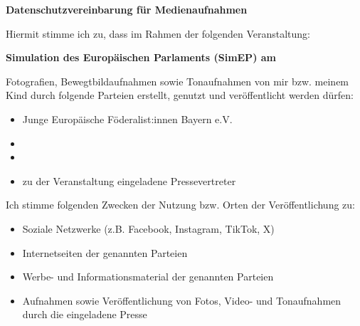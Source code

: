 \documentclass[10pt]{article}
\begin{document}
\thispagestyle{empty}

\begin{center}
    \textbf{\Large Datenschutzvereinbarung für Medienaufnahmen}
\end{center}

\vspace{0.5cm}

Hiermit stimme ich zu, dass im Rahmen der folgenden Veranstaltung:

\begin{center}
    \textbf{Simulation des Europäischen Parlaments (SimEP) am \datum\ \location}
\end{center}

Fotografien, Bewegtbildaufnahmen sowie Tonaufnahmen von mir bzw. meinem Kind durch folgende Parteien erstellt, genutzt und veröffentlicht werden dürfen:

\begin{itemize}[leftmargin=1.5cm]
    \item Junge Europäische Föderalist:innen Bayern e.V.
    \item \sponsor
    \iflocalSupportPresent
    \item \localSupport
    \fi
    \item zu der Veranstaltung eingeladene Pressevertreter
\end{itemize}

Ich stimme folgenden Zwecken der Nutzung bzw. Orten der Veröffentlichung zu:

\begin{itemize}[leftmargin=1.5cm]
    \item Soziale Netzwerke (z.B. Facebook, Instagram, TikTok, X)
    \item Internetseiten der genannten Parteien
    \item Werbe- und Informationsmaterial der genannten Parteien
    \item Aufnahmen sowie Veröffentlichung von Fotos, Video- und Tonaufnahmen durch die eingeladene Presse
\end{itemize}
\end{document}
